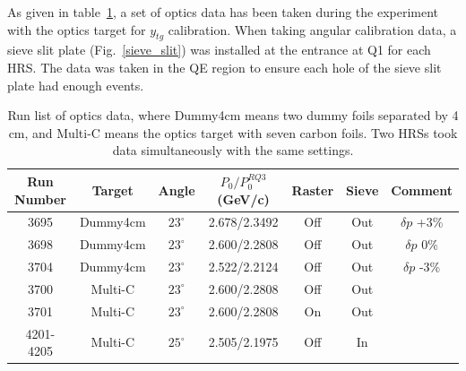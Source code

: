 As given in table~\ref{optics_data_table}, a set of optics data has been taken during the experiment with the optics target for $y_{tg}$ calibration. When taking angular calibration data, a sieve slit plate (Fig.~\ref{sieve_slit}) was installed at the entrance at Q1 for each HRS. The data was taken in the QE region to ensure each hole of the sieve slit plate had enough events. 
\begin{table}[!ht]
  \centering
  \begin{tabular}{|c||c|c|c|c|c|c|}
    \hline
    Run Number & Target   & Angle    & $P_{0} / P_{0}^{RQ3}$ (GeV/c)  & Raster & Sieve & Comment\\
    \hline \hline
    3695    & Dummy4cm & $23^{\circ}$ & 2.678/2.3492  &  Off   &  Out  & $\delta p$ +3\% \\
    \hline
    3698    & Dummy4cm & $23^{\circ}$ & 2.600/2.2808  &  Off   &  Out  & $\delta p$ 0\% \\
    \hline
    3704    & Dummy4cm & $23^{\circ}$ & 2.522/2.2124  &  Off   &  Out  & $\delta p$ -3\% \\
    \hline
    3700    & Multi-C  & $23^{\circ}$ & 2.600/2.2808  &  Off   &  Out  & \\
    \hline
    3701    & Multi-C  & $23^{\circ}$ & 2.600/2.2808  &  On    &  Out  & \\
    \hline
    4201-4205& Multi-C    & $25^{\circ}$ & 2.505/2.1975 & Off    &  In & \\
    \hline 
  \end{tabular}
  \caption[Run list of optics data.]{Run list of optics data, where Dummy4cm means two dummy foils separated by 4 cm, and Multi-C means the optics target with seven carbon foils. Two HRSs took data simultaneously with the same settings.}
  \label{optics_data_table}
\end{table}
